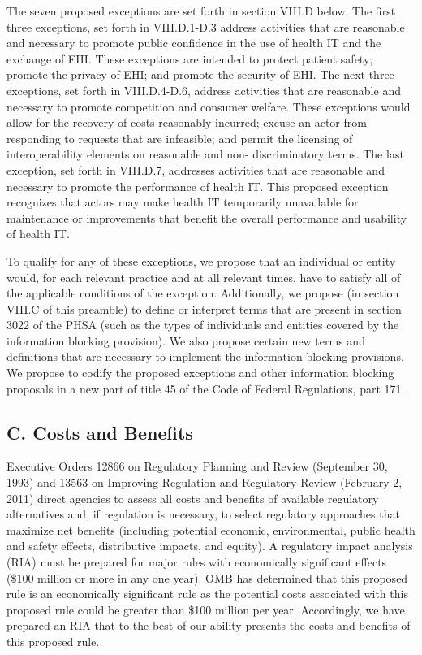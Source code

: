 \documentclass[twoside,11pt]{article}
\begin{document}
          The seven proposed exceptions are set forth in section VIII.D below. The first three exceptions, set forth in VIII.D.1-D.3 address activities that are reasonable and necessary to promote public confidence in the use of health IT and the exchange of EHI. These exceptions are intended to protect patient safety; promote the privacy of EHI; and promote the security of EHI. The next three exceptions, set forth in VIII.D.4-D.6, address activities that are reasonable and necessary to promote competition and consumer welfare. These exceptions would allow for the recovery of costs reasonably incurred; excuse an actor from responding to requests that are infeasible; and permit the licensing of interoperability elements on reasonable and non- discriminatory terms. The last exception, set forth in VIII.D.7, addresses activities that are reasonable and necessary to promote the performance of health IT. This proposed exception recognizes that actors may make health IT temporarily unavailable for maintenance or improvements that  \ifhmode\expandafter\xspace\fi benefit the overall performance and usability of health IT.


          To qualify for any of these exceptions, we propose that an individual or entity would, for each relevant practice and at all relevant times, have to satisfy all of the applicable conditions of the exception. Additionally, we propose (in section VIII.C of this preamble) to define or interpret terms that are present in section 3022 of the PHSA (such as the types of individuals and entities covered by the information blocking provision). We also propose certain new terms and definitions that are necessary to implement the information blocking provisions. We propose to codify the proposed exceptions and other information blocking proposals in a new part of title 45 of the Code of Federal Regulations, part 171.


          \subsection{C. Costs and Benefits}

          Executive Orders 12866 on Regulatory Planning and Review (September 30, 1993) and 13563 on Improving Regulation and Regulatory Review (February 2, 2011) direct agencies to assess all costs and benefits of available regulatory alternatives and, if regulation is necessary, to select regulatory approaches that maximize net benefits (including potential economic, environmental, public health and safety effects, distributive impacts, and equity). A regulatory impact analysis (RIA) must be prepared for major rules with economically significant effects (\$100 million or more in any one year). OMB has determined that this proposed rule is an economically significant rule as the potential costs associated with this proposed rule could be greater than \$100 million per year. Accordingly, we have prepared an RIA that to the best of our ability presents the costs and benefits of this proposed rule.
\end{document}

